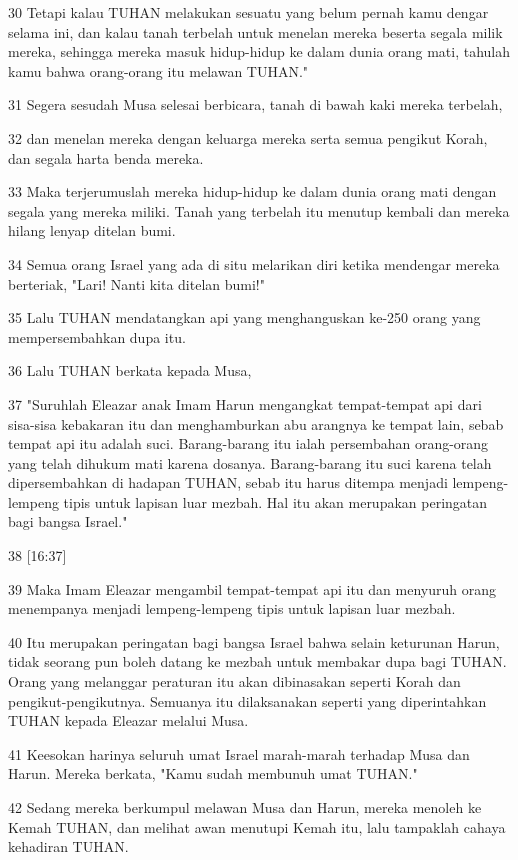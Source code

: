 \par 30 Tetapi kalau TUHAN melakukan sesuatu yang belum pernah kamu dengar selama ini, dan kalau tanah terbelah untuk menelan mereka beserta segala milik mereka, sehingga mereka masuk hidup-hidup ke dalam dunia orang mati, tahulah kamu bahwa orang-orang itu melawan TUHAN."
\par 31 Segera sesudah Musa selesai berbicara, tanah di bawah kaki mereka terbelah,
\par 32 dan menelan mereka dengan keluarga mereka serta semua pengikut Korah, dan segala harta benda mereka.
\par 33 Maka terjerumuslah mereka hidup-hidup ke dalam dunia orang mati dengan segala yang mereka miliki. Tanah yang terbelah itu menutup kembali dan mereka hilang lenyap ditelan bumi.
\par 34 Semua orang Israel yang ada di situ melarikan diri ketika mendengar mereka berteriak, "Lari! Nanti kita ditelan bumi!"
\par 35 Lalu TUHAN mendatangkan api yang menghanguskan ke-250 orang yang mempersembahkan dupa itu.
\par 36 Lalu TUHAN berkata kepada Musa,
\par 37 "Suruhlah Eleazar anak Imam Harun mengangkat tempat-tempat api dari sisa-sisa kebakaran itu dan menghamburkan abu arangnya ke tempat lain, sebab tempat api itu adalah suci. Barang-barang itu ialah persembahan orang-orang yang telah dihukum mati karena dosanya. Barang-barang itu suci karena telah dipersembahkan di hadapan TUHAN, sebab itu harus ditempa menjadi lempeng-lempeng tipis untuk lapisan luar mezbah. Hal itu akan merupakan peringatan bagi bangsa Israel."
\par 38 [16:37]
\par 39 Maka Imam Eleazar mengambil tempat-tempat api itu dan menyuruh orang menempanya menjadi lempeng-lempeng tipis untuk lapisan luar mezbah.
\par 40 Itu merupakan peringatan bagi bangsa Israel bahwa selain keturunan Harun, tidak seorang pun boleh datang ke mezbah untuk membakar dupa bagi TUHAN. Orang yang melanggar peraturan itu akan dibinasakan seperti Korah dan pengikut-pengikutnya. Semuanya itu dilaksanakan seperti yang diperintahkan TUHAN kepada Eleazar melalui Musa.
\par 41 Keesokan harinya seluruh umat Israel marah-marah terhadap Musa dan Harun. Mereka berkata, "Kamu sudah membunuh umat TUHAN."
\par 42 Sedang mereka berkumpul melawan Musa dan Harun, mereka menoleh ke Kemah TUHAN, dan melihat awan menutupi Kemah itu, lalu tampaklah cahaya kehadiran TUHAN.
